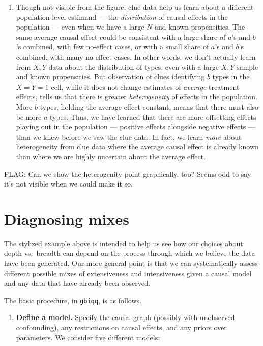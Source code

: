 \documentclass[
  12pt,
]{book}
\providecommand{\tightlist}{%
  \setlength{\itemsep}{0pt}\setlength{\parskip}{0pt}}
\begin{document}
\begin{enumerate}
\def\labelenumi{\arabic{enumi}.}
\setcounter{enumi}{2}
\tightlist
\item
  Though not visible from the figure, clue data help us learn about a different population-level estimand --- the \emph{distribution} of causal effects in the population --- even when we have a large \(N\) and known propensities. The same average causal effect could be consistent with a large share of \(a\)'s and \(b\)'s combined, with few no-effect cases, or with a small share of \(a\)'s and \(b\)'s combined, with many no-effect cases. In other words, we don't actually learn from \(X,Y\) data about the distribution of types, even with a large \(X,Y\) sample and known propensities. But observation of clues identifying \(b\) types in the \(X=Y=1\) cell, while it does not change estimates of \emph{average} treatment effects, tells us that there is greater \emph{heterogeneity} of effects in the population. More \(b\) types, holding the average effect constant, means that there must also be more \(a\) types. Thus, we have learned that there are more offsetting effects playing out in the population --- positive effects alongside negative effects --- than we knew before we saw the clue data. In fact, we learn \emph{more} about heterogeneity from clue data where the average causal effect is already known than where we are highly uncertain about the average effect.
\end{enumerate}

FLAG: Can we show the heterogenity point graphically, too? Seems odd to say it's not visible when we could make it so.

\hypertarget{diagnosing-mixes}{%
\section{Diagnosing mixes}\label{diagnosing-mixes}}

The stylized example above is intended to help us see how our choices about depth vs.~breadth can depend on the process through which we believe the data have been generated. Our more general point is that we can systematically assess different possible mixes of extensiveness and intensiveness given a causal model and any data that have already been observed.

The basic procedure, in \texttt{gbiqq}, is as follows.

\begin{enumerate}
\def\labelenumi{\arabic{enumi}.}
\tightlist
\item
  \textbf{Define a model.} Specify the causal graph (possibly with unobserved confounding), any restrictions on causal effects, and any priors over parameters. We consider five different models:
\end{enumerate}
\end{document}
